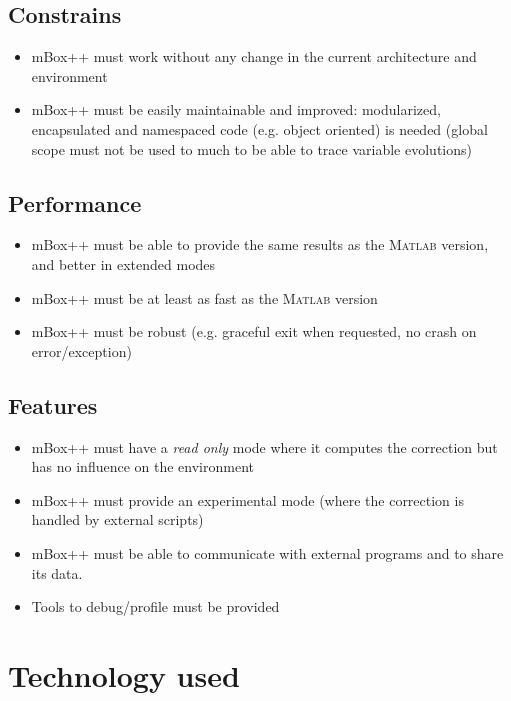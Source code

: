 \subsection{Constrains}
\begin{itemize}
    \item mBox++ must work without any change in the current architecture and environment
    \item mBox++ must be easily maintainable and improved: modularized, encapsulated and namespaced code (e.g. object oriented) is needed (global scope must not be used to much to be able to trace variable evolutions)
\end{itemize}

\subsection{Performance}
\begin{itemize}
    \item mBox++ must be able to provide the same results as the \textsc{Matlab} version, and better in extended modes
    \item mBox++ must be at least as fast as the \textsc{Matlab} version
    \item mBox++ must be robust (e.g. graceful exit when requested, no crash on error/exception)
\end{itemize}

\subsection{Features}
\begin{itemize}
    \item mBox++ must have a \textit{read only} mode where it computes the correction but has no influence on the environment
    \item mBox++ must provide an experimental mode (where the correction is handled by external scripts)
    \item mBox++ must be able to communicate with external programs and to share its data.
    \item Tools to debug/profile must be provided
\end{itemize}

\section{Technology used}

